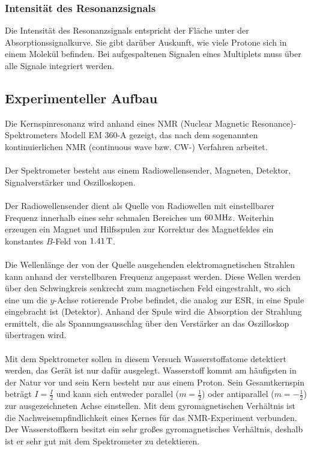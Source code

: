 \documentclass[a4paper,titlepage]{scrartcl}
\numberwithin{equation}{section}
\begin{document}
\subsubsection{Intensität des Resonanzsignals}
Die Intensität des Resonanzsignals entspricht der Fläche unter der Absorptionssignalkurve. Sie gibt darüber Auskunft, wie viele Protone sich in einem Molekül befinden. Bei aufgespaltenen Signalen eines Multiplets muss über alle Signale integriert werden.
\subsection{Experimenteller Aufbau}
Die Kernspinresonanz wird anhand eines NMR (Nuclear Magnetic Resonance)-Spektrometers Modell EM 360-A gezeigt, das nach dem sogenannten kontinuierlichen NMR (continuous wave bzw. CW-) Verfahren arbeitet.\\ \\
Der Spektrometer besteht aus einem Radiowellensender, Magneten, Detektor, Signalverstärker und Oszilloskopen.\\ \\ 
Der Radiowellensender dient als Quelle von Radiowellen mit einstellbarer Frequenz innerhalb eines sehr schmalen Bereiches um $\unit[60]{MHz}$. Weiterhin erzeugen ein Magnet und Hilfsspulen zur Korrektur des Magnetfeldes ein konstantes $B$-Feld von $\unit[1.41]{T}$.\\ \\
Die Wellenlänge der von der Quelle ausgehenden elektromagnetischen Strahlen kann anhand der verstellbaren Frequenz angepasst werden. Diese Wellen werden über den Schwingkreis senkrecht zum magnetischen Feld eingestrahlt, wo sich eine um die $y$-Achse rotierende Probe befindet, die analog zur ESR, in eine Spule eingebracht ist (Detektor). Anhand der Spule wird die Absorption der Strahlung ermittelt, die als Spannungsausschlag über den Verstärker an das Oszilloskop übertragen wird.\\ \\
Mit dem Spektrometer sollen in diesem Versuch Wasserstoffatome detektiert werden, das Gerät ist nur dafür ausgelegt. Wasserstoff kommt am häufigsten in der Natur vor und sein Kern besteht nur aus einem Proton. Sein Gesamtkernspin beträgt $I=\frac{I}{2}$ und kann sich entweder parallel ($m=\frac{1}{2}$) oder antiparallel ($m=-\frac{1}{2}$) zur ausgezeichneten Achse einstellen. Mit dem gyromagnetischen Verhältnis ist die Nachweisempfindlichkeit eines Kernes für das NMR-Experiment verbunden. Der Wasserstoffkern besitzt ein sehr großes gyromagnetisches Verhältnis, deshalb ist er sehr gut mit dem Spektrometer zu detektieren.
\end{document}

